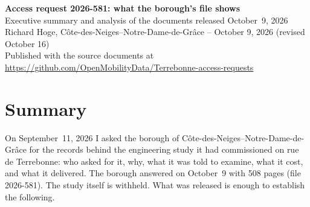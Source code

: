 \documentclass[11pt,letterpaper]{article}
\newcommand{\repourl}{https://github.com/OpenMobilityData/Terrebonne-access-requests}
\newcommand{\repo}[1]{\href{\repourl}{#1}}
\begin{document}
\begin{center}
{\Large\bfseries Access request 2026-581: what the borough's file shows}\\[0.4em]
{\large Executive summary and analysis of the documents released October~9, 2026}\\[0.6em]
Richard Hoge, C\^ote-des-Neiges--Notre-Dame-de-Gr\^ace -- October 9, 2026 (revised October 16)\\
Published with the source documents at \repo{\repourl}
\end{center}

\section*{Summary}

On September~11, 2026 I asked the borough of C\^ote-des-Neiges--Notre-Dame-de-Gr\^ace
for the records behind the engineering study it had commissioned on rue de
Terrebonne: who asked for it, why, what it was told to examine, what it cost,
and what it delivered. The borough answered on October~9 with 508 pages
(file 2026-581). The study itself is withheld. What was released is enough
to establish the following.
\end{document}
